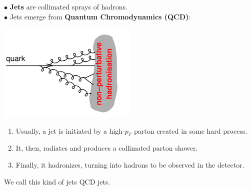 \documentclass[9pt,a4paper,unknownkeysallowed,xcolor=dvipsnames,aspectratio=43]{beamer}
\begin{document}
\begin{frame}{\bf\huge {}}
\vspace{2mm}
{\color{darkred}\Large$\bullet$} {\bf Jets} are collimated sprays of hadrons.\\
\vspace{2mm}
{\color{darkred}\Large$\bullet$} Jets emerge from {\bf Quantum Chromodynamics (QCD)}:\\
\vspace{1mm}
\begin{center}
\includegraphics[width=0.5\textwidth]{jetform.png}\\
\end{center}
\begin{enumerate}
    \item {\color{darkred}Usually}, a jet is initiated by a high-$p_T$ parton created in some hard process.
    \item It, then, radiates and produces a collimated parton shower.
    \item Finally, it hadronizes, turning into hadrons to be observed in the detector.
\end{enumerate}
We call this kind of jets {\color{darkred}QCD jets}.
\end{frame}
%
%
\end{document}
